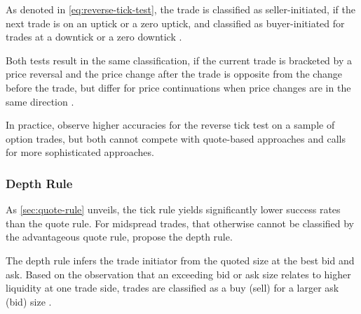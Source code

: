 As denoted in \cref{eq:reverse-tick-test}, the trade is classified as seller-initiated, if the next trade is on an uptick or a zero uptick, and classified as buyer-initiated for trades at a downtick or a zero downtick \autocite[][735--636]{leeInferringTradeDirection1991}.

Both tests result in the same classification, if the current trade is bracketed by a price reversal and the price change after the trade is opposite from the change before the trade, but differ for price continuations when price changes are in the same direction \autocite[][736]{leeInferringTradeDirection1991}.

In practice, \textcite[][29--32]{grauerOptionTradeClassification2022} observe higher accuracies for the reverse tick test on a sample of option trades, but both cannot compete with quote-based approaches and calls for more sophisticated approaches.

\subsubsection{Depth Rule}\label{sec:depth-rule}


As \cref{sec:quote-rule} unveils, the tick rule yields significantly lower success rates than the quote rule. For midspread trades, that otherwise cannot be classified by the advantageous quote rule, \textcite[][14]{grauerOptionTradeClassification2022} propose the depth rule.

The depth rule infers the trade initiator from the quoted size at the best bid and ask. Based on the observation that an exceeding bid or ask size relates to higher liquidity at one trade side, trades are classified as a buy (sell) for a larger ask (bid) size \autocite[][14]{grauerOptionTradeClassification2022}.

